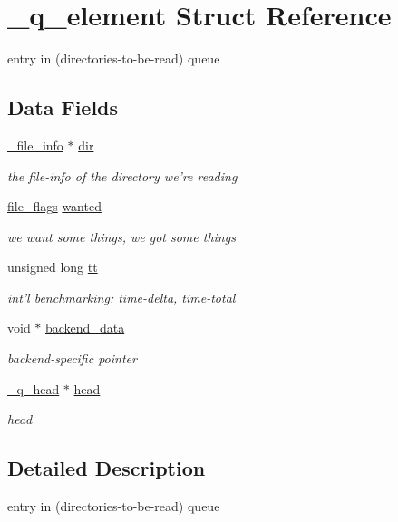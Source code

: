 \hypertarget{struct__q__element}{
\section{\_\-q\_\-element Struct Reference}
\label{struct__q__element}
}
entry in (directories-to-be-read) queue  


\subsection*{Data Fields}
\begin{CompactItemize}
\item 
\hypertarget{struct__q__element_o0}{
\hyperlink{struct__file__info}{\_\-file\_\-info} $\ast$ \hyperlink{struct__q__element_o0}{dir}}
\label{struct__q__element_o0}

\begin{CompactList}\small\item\em the file-info of the directory we're reading \item\end{CompactList}\item 
\hypertarget{struct__q__element_o2}{
\hyperlink{model_8h_a151}{file\_\-flags} \hyperlink{struct__q__element_o2}{wanted}}
\label{struct__q__element_o2}

\begin{CompactList}\small\item\em we want some things, we got some things \item\end{CompactList}\item 
\hypertarget{struct__q__element_o4}{
unsigned long \hyperlink{struct__q__element_o4}{tt}}
\label{struct__q__element_o4}

\begin{CompactList}\small\item\em int'l benchmarking: time-delta, time-total \item\end{CompactList}\item 
\hypertarget{struct__q__element_o5}{
void $\ast$ \hyperlink{struct__q__element_o5}{backend\_\-data}}
\label{struct__q__element_o5}

\begin{CompactList}\small\item\em backend-specific pointer \item\end{CompactList}\item 
\hypertarget{struct__q__element_o6}{
\hyperlink{struct__q__head}{\_\-q\_\-head} $\ast$ \hyperlink{struct__q__element_o6}{head}}
\label{struct__q__element_o6}

\begin{CompactList}\small\item\em head \item\end{CompactList}\end{CompactItemize}


\subsection{Detailed Description}
entry in (directories-to-be-read) queue 

